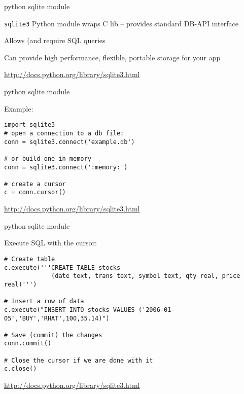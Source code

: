 \documentclass{beamer}
\begin{document}
\begin{frame}[fragile]{python sqlite module}

\vfill
{\Large \verb|sqlite3| Python module wraps C lib -- provides standard DB-API interface}

\vfill
{\Large Allows (and require SQL queries}

\vfill
{\Large Can provide high performance, flexible, portable storage for your app}

\vfill
\url{http://docs.python.org/library/sqlite3.html}
\end{frame} 

\begin{frame}[fragile]{python sqlite module}

{\Large Example:}

\begin{verbatim}
import sqlite3
# open a connection to a db file:
conn = sqlite3.connect('example.db')

# or build one in-memory
conn = sqlite3.connect(':memory:')

# create a cursor
c = conn.cursor()
\end{verbatim}

\vfill
\url{http://docs.python.org/library/sqlite3.html}
\end{frame} 


\begin{frame}[fragile]{python sqlite module}

{\Large Execute SQL with the cursor:}

\begin{verbatim}
# Create table
c.execute('''CREATE TABLE stocks
             (date text, trans text, symbol text, qty real, price real)''')

# Insert a row of data
c.execute("INSERT INTO stocks VALUES ('2006-01-05','BUY','RHAT',100,35.14)")

# Save (commit) the changes
conn.commit()

# Close the cursor if we are done with it
c.close()
\end{verbatim}

\vfill
\url{http://docs.python.org/library/sqlite3.html}
\end{frame} 
\end{document}

